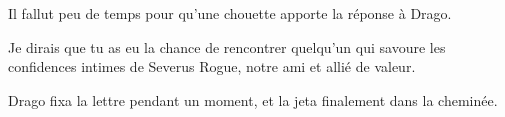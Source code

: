 Il fallut peu de temps pour qu'une chouette apporte la réponse à Drago.

\begin{writtenNote}

Je dirais que tu as eu la chance de rencontrer quelqu'un qui savoure les confidences intimes de Severus Rogue, notre ami et allié de valeur.

\end{writtenNote}

Drago fixa la lettre pendant un moment, et la jeta finalement dans la cheminée.

